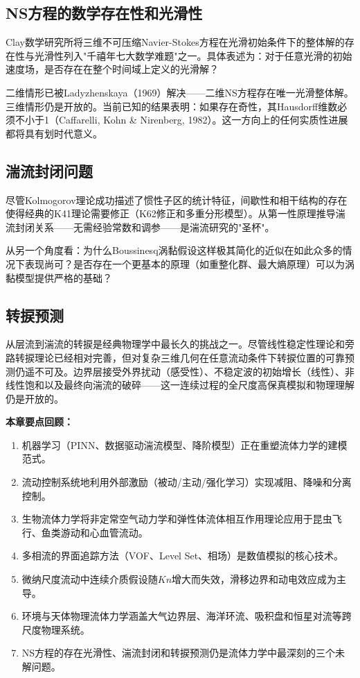 \subsection{NS方程的数学存在性和光滑性}

Clay数学研究所将三维不可压缩Navier-Stokes方程在光滑初始条件下的整体解的存在性与光滑性列入"千禧年七大数学难题"之一。具体表述为：对于任意光滑的初始速度场，是否存在在整个时间域上定义的光滑解？

二维情形已被Ladyzhenskaya（1969）解决——二维NS方程存在唯一光滑整体解。三维情形仍是开放的。当前已知的结果表明：如果存在奇性，其Hausdorff维数必须不小于1（Caffarelli, Kohn \& Nirenberg, 1982）。这一方向上的任何实质性进展都将具有划时代意义。

\subsection{湍流封闭问题}

尽管Kolmogorov理论成功描述了惯性子区的统计特征，间歇性和相干结构的存在使得经典的K41理论需要修正（K62修正和多重分形模型）。从第一性原理推导湍流封闭关系——无需经验常数和调参——是湍流研究的"圣杯"。

从另一个角度看：为什么Boussinesq涡黏假设这样极其简化的近似在如此众多的情况下表现尚可？是否存在一个更基本的原理（如重整化群、最大熵原理）可以为涡黏模型提供严格的基础？

\subsection{转捩预测}

从层流到湍流的转捩是经典物理学中最长久的挑战之一。尽管线性稳定性理论和旁路转捩理论已经相对完善，但对复杂三维几何在任意流动条件下转捩位置的可靠预测仍遥不可及。边界层接受外界扰动（感受性）、不稳定波的初始增长（线性）、非线性饱和以及最终向湍流的破碎——这一连续过程的全尺度高保真模拟和物理理解仍是开放的。

\vspace{12pt}

\noindent\textbf{本章要点回顾：}
\begin{enumerate}
  \item 机器学习（PINN、数据驱动湍流模型、降阶模型）正在重塑流体力学的建模范式。
  \item 流动控制系统地利用外部激励（被动/主动/强化学习）实现减阻、降噪和分离控制。
  \item 生物流体力学将非定常空气动力学和弹性体流体相互作用理论应用于昆虫飞行、鱼类游动和心血管流动。
  \item 多相流的界面追踪方法（VOF、Level Set、相场）是数值模拟的核心技术。
  \item 微纳尺度流动中连续介质假设随$Kn$增大而失效，滑移边界和动电效应成为主导。
  \item 环境与天体物理流体力学涵盖大气边界层、海洋环流、吸积盘和恒星对流等跨尺度物理系统。
  \item NS方程的存在光滑性、湍流封闭和转捩预测仍是流体力学中最深刻的三个未解问题。
\end{enumerate}
